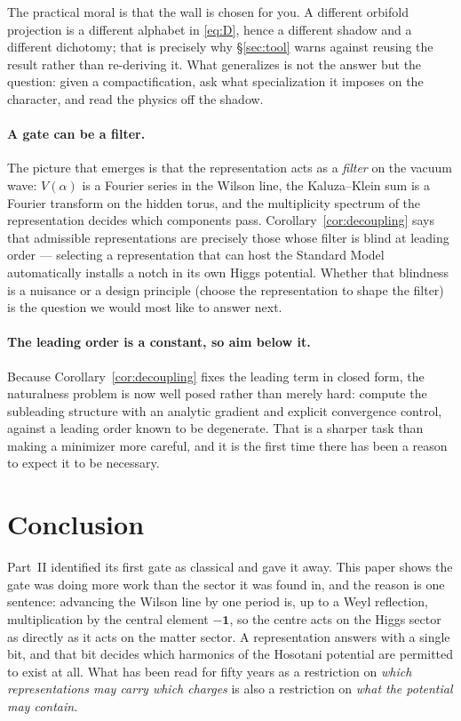 \documentclass[11pt,a4paper]{article}
\begin{document}
The practical moral is that the wall is chosen for you. A different orbifold projection is a
different alphabet in \eqref{eq:D}, hence a different shadow and a different dichotomy; that
is precisely why \S\ref{sec:tool} warns against reusing the result rather than re-deriving
it. What generalizes is not the answer but the question: given a compactification, ask what
specialization it imposes on the character, and read the physics off the shadow.

\paragraph{A gate can be a filter.} The picture that emerges is that the representation acts
as a \emph{filter} on the vacuum wave: $V(\alpha)$ is a Fourier series in the Wilson line,
the Kaluza--Klein sum is a Fourier transform on the hidden torus, and the multiplicity
spectrum of the representation decides which components pass. Corollary~\ref{cor:decoupling}
says that admissible representations are precisely those whose filter is blind at leading
order --- selecting a representation that can host the Standard Model automatically installs
a notch in its own Higgs potential. Whether that blindness is a nuisance or a design
principle (choose the representation to shape the filter) is the question we would most like
to answer next.

\paragraph{The leading order is a constant, so aim below it.} Because
Corollary~\ref{cor:decoupling} fixes the leading term in closed form, the naturalness problem
is now well posed rather than merely hard: compute the subleading structure with an analytic
gradient and explicit convergence control, against a leading order known to be degenerate.
That is a sharper task than making a minimizer more careful, and it is the first time there
has been a reason to expect it to be necessary.

\section{Conclusion}\label{sec:conclusion}
Part~II identified its first gate as classical and gave it away. This paper shows the gate was
doing more work than the sector it was found in, and the reason is one sentence: advancing the
Wilson line by one period is, up to a Weyl reflection, multiplication by the central element
$-\mathbf{1}$, so the centre acts on the Higgs sector as directly as it acts on the matter
sector. A representation answers with a single bit, and that bit decides which harmonics of
the Hosotani potential are permitted to exist at all. What has been read for fifty years as a
restriction on \emph{which representations may carry which charges} is also a restriction on
\emph{what the potential may contain}.
\end{document}
